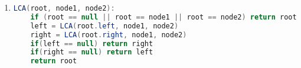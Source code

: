 \documentclass{article}
\begin{document}
\begin{enumerate}
\begin{lstlisting}[language=Python]
    

\end{lstlisting}

\item
\begin{lstlisting}[language=Java]
LCA(root, node1, node2):
    if (root == null || root == node1 || root == node2) return root
    left = LCA(root.left, node1, node2)
    right = LCA(root.right, node1, node2)
    if(left == null) return right
    if(right == null) return left
    return root
\end{lstlisting}
    
    
\end{enumerate}

\begin{lstlisting}[language=Java]

\end{lstlisting}
\end{document}
